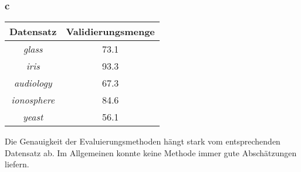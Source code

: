 \subsubsection*{c}
\begin{tabular}{c|c}
				Datensatz         & Validierungsmenge    \\ \hline
				\emph{glass}      & 73.1     \\ \hline
				\emph{iris}       & 93.3     \\ \hline
				\emph{audiology}  & 67.3   \\ \hline
				\emph{ionosphere} & 84.6   \\ \hline
				\emph{yeast}      & 56.1 \\ \hline
\end{tabular}

Die Genauigkeit der Evaluierungsmethoden h\"angt stark vom entsprechenden Datensatz ab. Im Allgemeinen konnte keine Methode immer gute Absch\"atzungen liefern.
